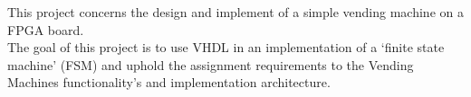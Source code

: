 This project concerns the design and implement of a simple vending machine on a FPGA board.\\   
The goal of this project is to use VHDL in an implementation of a `finite state machine' (FSM) and uphold the assignment requirements to the Vending Machines functionality's and implementation architecture.

